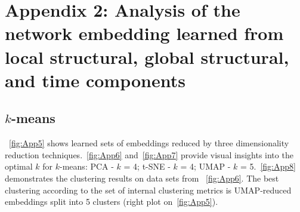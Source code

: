 \chapter{Appendix 2: Analysis of the network embedding learned from local structural, global structural, and time components}
\label{appendix:k-means_time_struc}

\section{$k$-means}
~\autoref{fig:App5} shows learned sets of embeddings reduced by three dimensionality reduction techniques.~\autoref{fig:App6} and~\autoref{fig:App7} provide visual insights into the optimal $k$ for $k$-means: PCA - $k$ = 4; t-SNE - $k$ = 4; UMAP - $k$ = 5.~\autoref{fig:App8} demonstrates the clustering results on data sets from ~\autoref{fig:App6}. The best clustering according to the set of internal clustering metrics is UMAP-reduced embeddings split into 5 clusters (right plot on~\autoref{fig:App5}).

